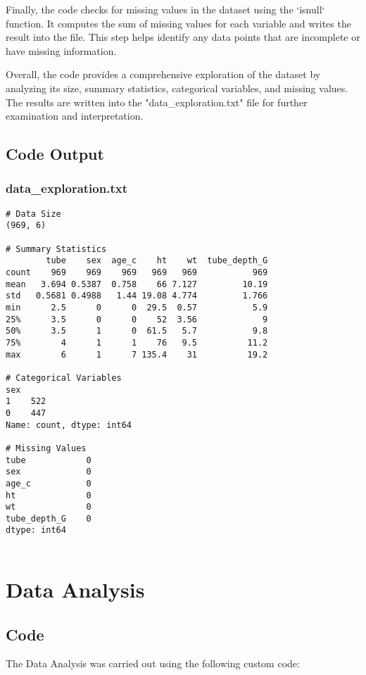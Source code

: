 \documentclass[11pt]{article}
\begin{document}
Finally, the code checks for missing values in the dataset using the `isnull` function. It computes the sum of missing values for each variable and writes the result into the file. This step helps identify any data points that are incomplete or have missing information.

Overall, the code provides a comprehensive exploration of the dataset by analyzing its size, summary statistics, categorical variables, and missing values. The results are written into the "data\_exploration.txt" file for further examination and interpretation.

\subsection{Code Output}

\subsubsection*{data\_exploration.txt}

\begin{Verbatim}[tabsize=4]
# Data Size
(969, 6)

# Summary Statistics
        tube    sex  age_c    ht    wt  tube_depth_G
count    969    969    969   969   969           969
mean   3.694 0.5387  0.758    66 7.127         10.19
std   0.5681 0.4988   1.44 19.08 4.774         1.766
min      2.5      0      0  29.5  0.57           5.9
25%      3.5      0      0    52  3.56             9
50%      3.5      1      0  61.5   5.7           9.8
75%        4      1      1    76   9.5          11.2
max        6      1      7 135.4    31          19.2

# Categorical Variables
sex
1    522
0    447
Name: count, dtype: int64

# Missing Values
tube            0
sex             0
age_c           0
ht              0
wt              0
tube_depth_G    0
dtype: int64


\end{Verbatim}

\section{Data Analysis}
\subsection{{Code}}
The Data Analysis was carried out using the following custom code:
\end{document}
